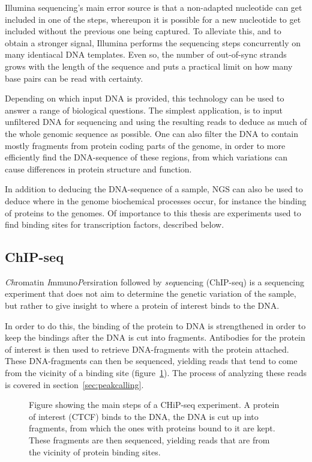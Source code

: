 Illumina sequencing's main error source is that a non-adapted nucleotide can get included in one of the steps, whereupon it is possible for a new nucleotide to get included without the previous one being captured.
To alleviate this, and to obtain a stronger signal, Illumina performs the sequencing steps concurrently on many identiacal DNA templates. Even so, the number of out-of-sync strands grows with the length of the sequence and puts a practical limit on how many base pairs can be read with certainty.

Depending on which input DNA is provided, this technology can be used to answer a range of biological questions.
The simplest application, is to input unfiltered DNA for sequencing and using the resulting reads to deduce as much of the whole genomic sequence as possible. One can also filter the DNA to contain mostly fragments from protein coding parts of the genome, in order to more efficiently find the DNA-sequence of these regions, from which variations can cause differences in protein structure and function.

In addition to deducing the DNA-sequence of a sample, NGS can also be used to deduce where in the genome biochemical processes occur, for instance the binding of proteins to the genomes. Of importance to this thesis are experiments used to find binding sites for transcription factors, described below.

\subsection{ChIP-seq}
\emph{Ch}romatin \emph{I}mmuno\emph{P}ersiration followed by \emph{seq}uencing (ChIP-seq) is a sequencing experiment that does not aim to determine the genetic variation of the sample, but rather to give insight to where a protein of interest binds to the DNA.

In order to do this, the binding of the protein to DNA is strengthened in order to keep the bindings after the DNA is cut into fragments.
Antibodies for the protein of interest is then used to retrieve DNA-fragments with the protein attached.
These DNA-fragments can then be sequenced, yielding reads that tend to come from the vicinity of a binding site (figure~\ref{fig:chipseq}). The process of analyzing these reads is covered in section~\ref{sec:peakcalling}.
\begin{figure}

\caption{
  Figure showing the main steps of a CHiP-seq experiment. A protein of interest (CTCF) binds to the DNA, the DNA is cut up into fragments, from which the ones with proteins bound to it are kept. These fragments are then sequenced, yielding reads that are from the vicinity of protein binding sites.}
\label{fig:chipseq}
\end{figure}
